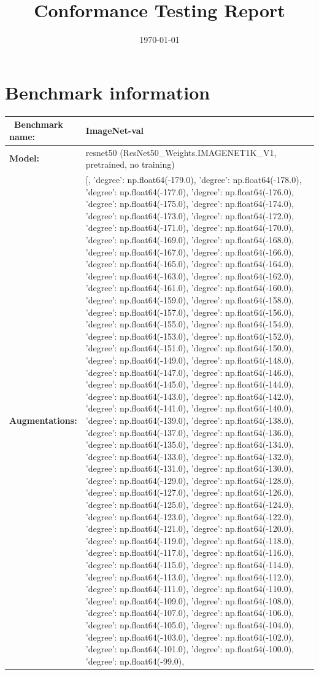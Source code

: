 \documentclass[parskip=half]{scrartcl}
\title{Conformance Testing Report}
\author{\relax}\date{\today}
\begin{document}
 \maketitle
        \section{Benchmark information}
        \begin{tabular}{l|l} \
        \textbf{Benchmark name:} & ImageNet-val \\ \hline
        \textbf{Model:} & resnet50 (ResNet50_Weights.IMAGENET1K_V1, pretrained, no training) \\ \hline
        \textbf{Augmentations:} & [{}, {'degree': np.float64(-179.0)}, {'degree': np.float64(-178.0)}, {'degree': np.float64(-177.0)}, {'degree': np.float64(-176.0)}, {'degree': np.float64(-175.0)}, {'degree': np.float64(-174.0)}, {'degree': np.float64(-173.0)}, {'degree': np.float64(-172.0)}, {'degree': np.float64(-171.0)}, {'degree': np.float64(-170.0)}, {'degree': np.float64(-169.0)}, {'degree': np.float64(-168.0)}, {'degree': np.float64(-167.0)}, {'degree': np.float64(-166.0)}, {'degree': np.float64(-165.0)}, {'degree': np.float64(-164.0)}, {'degree': np.float64(-163.0)}, {'degree': np.float64(-162.0)}, {'degree': np.float64(-161.0)}, {'degree': np.float64(-160.0)}, {'degree': np.float64(-159.0)}, {'degree': np.float64(-158.0)}, {'degree': np.float64(-157.0)}, {'degree': np.float64(-156.0)}, {'degree': np.float64(-155.0)}, {'degree': np.float64(-154.0)}, {'degree': np.float64(-153.0)}, {'degree': np.float64(-152.0)}, {'degree': np.float64(-151.0)}, {'degree': np.float64(-150.0)}, {'degree': np.float64(-149.0)}, {'degree': np.float64(-148.0)}, {'degree': np.float64(-147.0)}, {'degree': np.float64(-146.0)}, {'degree': np.float64(-145.0)}, {'degree': np.float64(-144.0)}, {'degree': np.float64(-143.0)}, {'degree': np.float64(-142.0)}, {'degree': np.float64(-141.0)}, {'degree': np.float64(-140.0)}, {'degree': np.float64(-139.0)}, {'degree': np.float64(-138.0)}, {'degree': np.float64(-137.0)}, {'degree': np.float64(-136.0)}, {'degree': np.float64(-135.0)}, {'degree': np.float64(-134.0)}, {'degree': np.float64(-133.0)}, {'degree': np.float64(-132.0)}, {'degree': np.float64(-131.0)}, {'degree': np.float64(-130.0)}, {'degree': np.float64(-129.0)}, {'degree': np.float64(-128.0)}, {'degree': np.float64(-127.0)}, {'degree': np.float64(-126.0)}, {'degree': np.float64(-125.0)}, {'degree': np.float64(-124.0)}, {'degree': np.float64(-123.0)}, {'degree': np.float64(-122.0)}, {'degree': np.float64(-121.0)}, {'degree': np.float64(-120.0)}, {'degree': np.float64(-119.0)}, {'degree': np.float64(-118.0)}, {'degree': np.float64(-117.0)}, {'degree': np.float64(-116.0)}, {'degree': np.float64(-115.0)}, {'degree': np.float64(-114.0)}, {'degree': np.float64(-113.0)}, {'degree': np.float64(-112.0)}, {'degree': np.float64(-111.0)}, {'degree': np.float64(-110.0)}, {'degree': np.float64(-109.0)}, {'degree': np.float64(-108.0)}, {'degree': np.float64(-107.0)}, {'degree': np.float64(-106.0)}, {'degree': np.float64(-105.0)}, {'degree': np.float64(-104.0)}, {'degree': np.float64(-103.0)}, {'degree': np.float64(-102.0)}, {'degree': np.float64(-101.0)}, {'degree': np.float64(-100.0)}, {'degree': np.float64(-99.0)}, 
\end{tabular}
\end{document}
